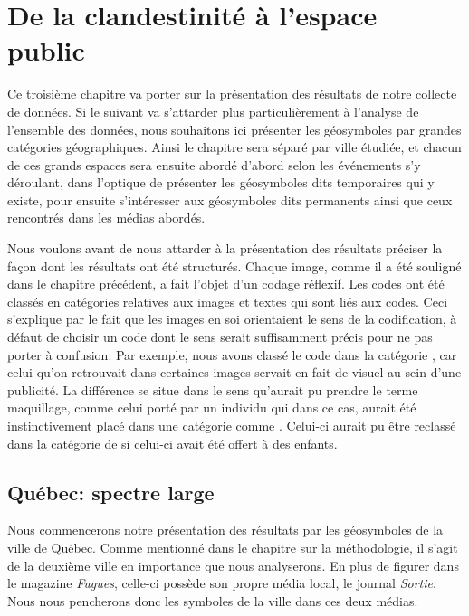 \chapter{De la clandestinité à l'espace public}
\label{cha:de_la_clandestinite_a_l_espace_public}

Ce troisième chapitre va porter sur la présentation des résultats de notre collecte de données.
Si le suivant va s'attarder plus particulièrement à l'analyse de l'ensemble des données, nous souhaitons ici présenter les géosymboles par grandes catégories géographiques.
Ainsi le chapitre sera séparé par ville étudiée, et chacun de ces grands espaces sera ensuite abordé d'abord selon les événements s'y déroulant, dans l'optique de présenter les géosymboles dits temporaires qui y existe, pour ensuite s'intéresser aux géosymboles dits permanents ainsi que ceux rencontrés dans les médias abordés.

Nous voulons avant de nous attarder à la présentation des résultats préciser la façon dont les résultats ont été structurés.
Chaque image, comme il a été souligné dans le chapitre précédent, a fait l'objet d'un codage réflexif.
Les codes ont été classés en catégories relatives aux images et textes qui sont liés aux codes.
Ceci s'explique par le fait que les images en soi orientaient le sens de la codification, à défaut de choisir un code dont le sens serait suffisamment précis pour ne pas porter à confusion.
Par exemple, nous avons classé le code  dans la catégorie , car celui qu'on retrouvait dans certaines images servait en fait de visuel au sein d'une publicité.
La différence se situe dans le sens qu'aurait pu prendre le terme maquillage, comme celui porté par un individu qui dans ce cas, aurait été instinctivement placé dans une catégorie comme .
Celui-ci aurait pu être reclassé dans la catégorie de  si celui-ci avait été offert à des enfants.

\section{Québec: spectre large}
\label{sec:qu_bec_spectre_large}

Nous commencerons notre présentation des résultats par les géosymboles de la ville de Québec.
Comme mentionné dans le chapitre sur la méthodologie, il s'agit de la deuxième ville en importance que nous analyserons.
En plus de figurer dans le magazine \emph{Fugues}, celle-ci possède son propre média local, le journal \emph{Sortie}.
Nous nous pencherons donc les symboles de la ville dans ces deux médias.

